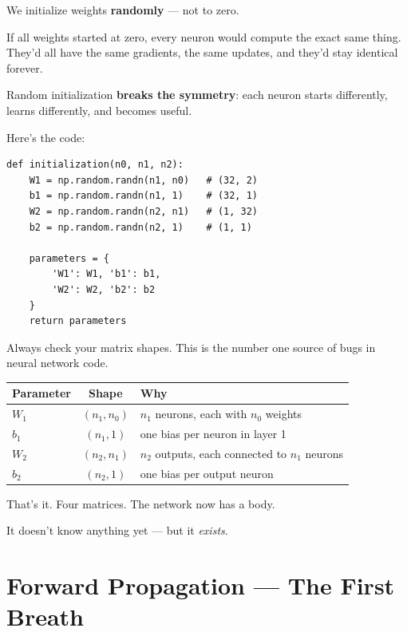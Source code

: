 \documentclass[11pt]{article}
\begin{document}
\begin{defbox}[title=Why Random Initialization?]
We initialize weights \textbf{randomly} --- not to zero.

If all weights started at zero, every neuron would compute the exact same thing.
They'd all have the same gradients, the same updates, and they'd stay identical forever.

Random initialization \textbf{breaks the symmetry}: each neuron starts differently, learns differently, and becomes useful.
\end{defbox}

Here's the code:

\begin{lstlisting}
def initialization(n0, n1, n2):
    W1 = np.random.randn(n1, n0)   # (32, 2)
    b1 = np.random.randn(n1, 1)    # (32, 1)
    W2 = np.random.randn(n2, n1)   # (1, 32)
    b2 = np.random.randn(n2, 1)    # (1, 1)

    parameters = {
        'W1': W1, 'b1': b1,
        'W2': W2, 'b2': b2
    }
    return parameters
\end{lstlisting}

\begin{insightbox}[title=Checkpoint: Dimensions]
Always check your matrix shapes. This is the number one source of bugs in neural network code.

\begin{center}
\begin{tabular}{l c l}
\textbf{Parameter} & \textbf{Shape} & \textbf{Why} \\
\hline
$W_1$ & $(n_1, n_0)$ & $n_1$ neurons, each with $n_0$ weights \\
$b_1$ & $(n_1, 1)$ & one bias per neuron in layer 1 \\
$W_2$ & $(n_2, n_1)$ & $n_2$ outputs, each connected to $n_1$ neurons \\
$b_2$ & $(n_2, 1)$ & one bias per output neuron \\
\end{tabular}
\end{center}
\end{insightbox}

That's it. Four matrices. The network now has a body.

It doesn't know anything yet --- but it \textit{exists}.

\section{Forward Propagation --- The First Breath}
\end{document}
